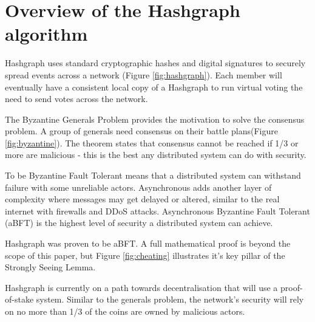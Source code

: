 \section{Overview of the Hashgraph algorithm}



Hashgraph uses standard cryptographic hashes and digital signatures to securely spread events across a network (Figure \ref{fig:hashgraph}). Each member will eventually have a consistent local copy of a Hashgraph to run virtual voting the need to send votes across the network\cite{baird2016}.


The Byzantine Generals Problem\cite{shostak1982byzantine} provides the motivation to solve the consensus problem. A group of generals need consensus on their battle plans(Figure \ref{fig:byzantine}). The theorem states that consensus cannot be reached if 1/3 or more are malicious - this is the best any distributed system can do with security.

To be Byzantine Fault Tolerant means that a distributed system can withstand failure with some unreliable actors. Asynchronous adds another layer of complexity where messages may get delayed or altered, similar to the real internet with firewalls and DDoS attacks. Asynchronous Byzantine Fault Tolerant (aBFT) is the highest level of security a distributed system can achieve\cite{coq2018}.



Hashgraph was proven to be aBFT. A full mathematical proof is beyond the scope of this paper, but Figure \ref{fig:cheating} illustrates it's key pillar of the Strongly Seeing Lemma.

% 

Hashgraph is currently on a path towards decentralisation that will use a proof-of-stake system. Similar to the generals problem, the network's security will rely on no more than 1/3 of the coins are owned by malicious actors. 



